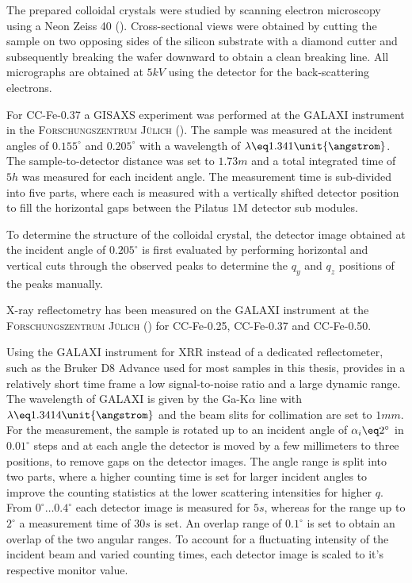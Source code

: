 \documentclass[\main/dresen_thesis.tex]{subfiles}
\begin{document}
    The prepared colloidal crystals were studied by scanning electron microscopy using a Neon Zeiss 40 ().
    Cross-sectional views were obtained by cutting the sample on two opposing sides of the silicon substrate with a diamond cutter and subsequently breaking the wafer downward to obtain a clean breaking line.
    All micrographs are obtained at $5 \unit{kV}$ using the detector for the back-scattering electrons.

    For CC-Fe-0.37 a GISAXS experiment was performed at the GALAXI instrument in the \textsc{Forschungszentrum J\"ulich} ().
    The sample was measured at the incident angles of $0.155 ^\circ$ and $0.205 ^\circ$ with a wavelength of $\lambda \eq 1.341 \unit{\angstrom}$.
    The sample-to-detector distance was set to $1.73 \unit{m}$ and a total integrated time of $5 \unit{h}$ was measured for each incident angle.
    The measurement time is sub-divided into five parts, where each is measured with a vertically shifted detector position to fill the horizontal gaps between the Pilatus 1M detector sub modules.

    To determine the structure of the colloidal crystal, the detector image obtained at the incident angle of $0.205 ^\circ$ is first evaluated by performing horizontal and vertical cuts through the observed peaks to determine the $q_y$ and $q_z$ positions of the peaks manually.

    X-ray reflectometry has been measured on the GALAXI instrument at the \textsc{Forschungszentrum J\"ulich} () for CC-Fe-0.25, CC-Fe-0.37 and CC-Fe-0.50.

    Using the GALAXI instrument for XRR instead of a dedicated reflectometer, such as the Bruker D8 Advance used for most samples in this thesis, provides in a relatively short time frame a low signal-to-noise ratio and a large dynamic range.
    The wavelength of GALAXI is given by the Ga-K$\alpha$ line with $\lambda \eq 1.3414 \unit{\angstrom}$ and the beam slits for collimation are set to $1 \unit{mm}$.
    For the measurement, the sample is rotated up to an incident angle of $\alpha_i \eq 2^\circ$ in $0.01 ^\circ$ steps and at each angle the detector is moved by a few millimeters to three positions, to remove gaps on the detector images.
    The angle range is split into two parts, where a higher counting time is set for larger incident angles to improve the counting statistics at the lower scattering intensities for higher $q$.
    From $0 ^\circ \ldots 0.4 ^\circ$ each detector image is measured for $5 \unit{s}$, whereas for the range up to $2 ^\circ$ a measurement time of $30 \unit{s}$ is set.
    An overlap range of $0.1 ^\circ$ is set to obtain an overlap of the two angular ranges.
    To account for a fluctuating intensity of the incident beam and varied counting times, each detector image is scaled to it's respective monitor value.
\end{document}
